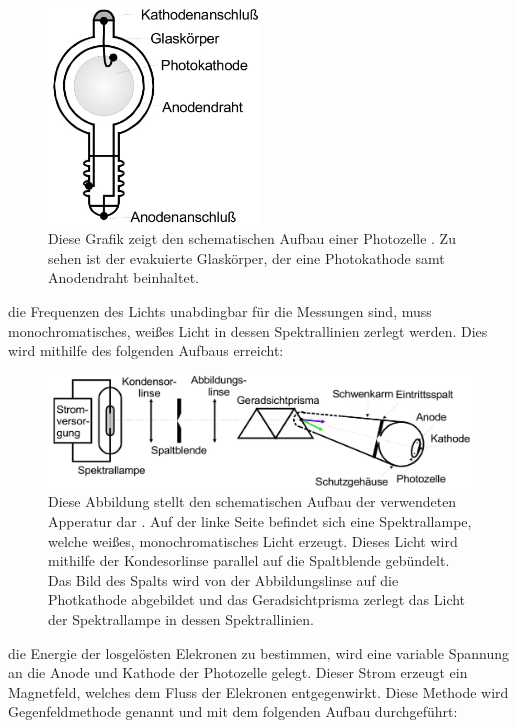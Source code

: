     \begin{figure}[H]
        \centering
        \includegraphics[width=0.5\textwidth]{images/Photozelle.jpg}
        \caption{Diese Grafik zeigt den schematischen Aufbau einer Photozelle \cite{V500}. Zu sehen ist der evakuierte Glaskörper, der eine Photokathode samt Anodendraht beinhaltet.}
        \label{fig:1}
    \end{figure}
    \justifying die Frequenzen des Lichts unabdingbar für die Messungen sind, muss monochromatisches, weißes Licht in dessen Spektrallinien zerlegt werden. Dies wird mithilfe des folgenden 
    Aufbaus erreicht:
    \begin{figure}[H]
        \centering
        \includegraphics[width=\textwidth]{images/Schema.jpg}
        \caption{Diese Abbildung stellt den schematischen Aufbau der verwendeten Apperatur dar \cite{V500}. Auf der linke Seite befindet sich eine Spektrallampe, welche weißes, monochromatisches
        Licht erzeugt. Dieses Licht wird mithilfe der Kondesorlinse parallel auf die Spaltblende gebündelt. Das Bild des Spalts wird von der Abbildungslinse auf die Photkathode 
        abgebildet und das Geradsichtprisma zerlegt das Licht der Spektrallampe in dessen Spektrallinien.}
        \label{fig:2}
    \end{figure}
    \justifying die Energie der losgelösten Elekronen zu bestimmen, wird eine variable Spannung an die Anode und Kathode der Photozelle gelegt. Dieser Strom erzeugt ein Magnetfeld, welches 
    dem Fluss der Elekronen entgegenwirkt. Diese Methode wird Gegenfeldmethode genannt und mit dem folgenden Aufbau durchgeführt:
